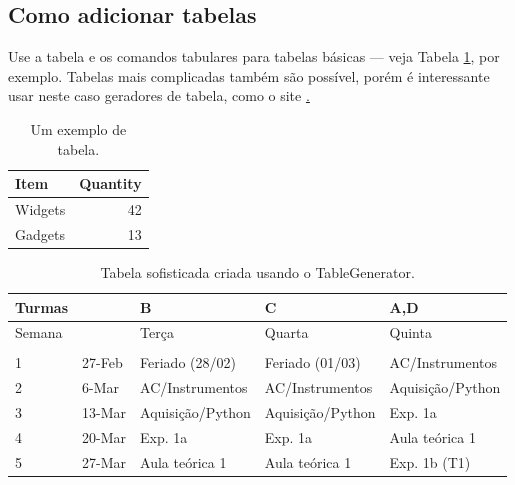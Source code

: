 \documentclass[a4paper]{article}
\begin{document}
\subsection{Como adicionar tabelas}

Use a tabela e os comandos tabulares para tabelas básicas --- veja Tabela \ref{tab:widgets}, por exemplo. Tabelas mais complicadas também são possível, porém é interessante usar neste caso geradores de tabela, como o site \href{http://www.tablesgenerator.com}.

\begin{table}
\centering
\begin{tabular}{l|r}
Item & Quantity \\\hline
Widgets & 42 \\
Gadgets & 13
\end{tabular}
\caption{\label{tab:widgets}Um exemplo de tabela.}
\end{table}

\begin{table}
\centering

\begin{tabular}{@{}lllll@{}}
\toprule

\rowcolor[HTML]{BBDAFF} 
Turmas &        & B                                       & C                                        & A,D                             \\ \midrule
Semana &        & Terça                                   & Quarta                                   & Quinta                          \\
       &        &                                         &                                          &                                 \\
1      & 27-Feb & \cellcolor[HTML]{96FFFB}Feriado (28/02) & \cellcolor[HTML]{96FFFB}Feriado (01/03)  & AC/Instrumentos                 \\
2      & 6-Mar  & AC/Instrumentos                         & AC/Instrumentos                          & Aquisição/Python                \\
3      & 13-Mar & Aquisição/Python                        & \cellcolor[HTML]{FFCCC9}Aquisição/Python & \cellcolor[HTML]{FFCCC9}Exp. 1a \\
4      & 20-Mar & Exp. 1a                                 & Exp. 1a                                  & Aula teórica 1                  \\
5      & 27-Mar & Aula teórica 1                          & Aula teórica 1                           & Exp. 1b (T1)                   
\end{tabular}
\caption{Tabela sofisticada criada usando o TableGenerator.}
\label{tab:tabela_bonita}
\end{table}
\end{document}
